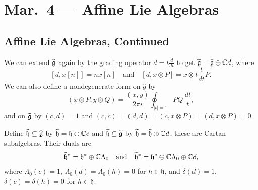 \chapter{Mar.~4 --- Affine Lie Algebras}

\section{Affine Lie Algebras, Continued}
\begin{remark}
  We can extend
  $\widehat{\mathfrak{g}}$ again
  by the grading operator
  $d = t \frac{d}{dt}$ to get
  $\widetilde{\mathfrak{g}} = \widehat{\mathfrak{g}} \oplus \mathbb{C} d$,
  where
  \[
    [d, x[n]] = n x[n] \quad \text{and} \quad
    [d, x \otimes P] = x \otimes t\frac{t}{dt} P.
  \]
  We can also define a nondegenerate form
  on $\widehat{g}$ by
  \[
    (x \otimes P, y \otimes Q)
    = \frac{(x, y)}{2\pi i} \oint_{|t| = 1} P Q\, \frac{dt}{t},
  \]
  and on $\widetilde{\mathfrak{g}}$ by
  $(c, d) = 1$ and $(c, c) = (d, d) = (c, x \otimes P) = (d, x \otimes P) = 0$.
\end{remark}

\begin{definition}
  Define $\widehat{\mathfrak{h}} \subseteq \widehat{\mathfrak{g}}$
  by $\widehat{\mathfrak{h}} = \mathfrak{h} \oplus \mathbb{C} c$
  and $\widetilde{\mathfrak{h}} \subseteq \widetilde{\mathfrak{g}}$
  by $\widetilde{\mathfrak{h}} = \widehat{\mathfrak{h}} \oplus \mathbb{C} d$,
  these are Cartan subalgebras.
  Their duals are
  \[
    \widehat{\mathfrak{h}}^* = \mathfrak{h}^* \oplus \mathbb{C} \Lambda_0
    \quad \text{and} \quad
    \widetilde{\mathfrak{h}}^* = \mathfrak{h}^* \oplus \mathbb{C} \Lambda_0 \oplus \mathbb{C} \delta,
  \]
  where $\Lambda_0(c) = 1$,
  $\Lambda_0(d) = \Lambda_0(h) = 0$ for
  $h \in \mathfrak{h}$,
  and $\delta(d) = 1$,
  $\delta(c) = \delta(h) = 0$ for $h \in \mathfrak{h}$.
\end{definition}


